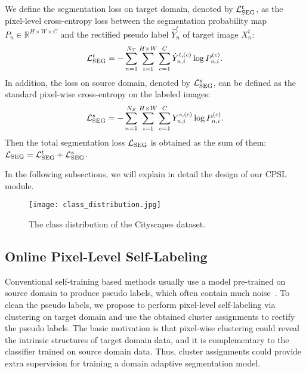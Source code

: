 \documentclass[10pt,twocolumn,letterpaper]{article}
\begin{document}
	We define the segmentation loss on target domain, denoted by $\mathcal{L}_{\rm SEG}^t$, as the pixel-level cross-entropy loss between the segmentation probability map $P_n\in \mathbb{R}^{H\times W\times C}$ and the rectified pseudo label $\hat{Y}_n^t$ of target image $X^t_{n}$:
\begin{align}
		\mathcal{L}_{\rm SEG}^t = -\sum_{n=1}^{N_T}\sum_{i=1}^{H\times W}\sum_{c=1}^{C}\hat{Y}^{t,(c)}_{n,i} \log{P}_{n,i}^{(c)}.
		\label{eq2}
	\end{align}   
In addition, the loss on source domain, denoted by $\mathcal{L}_{\rm SEG}^s$, can be defined as the standard pixel-wise cross-entropy on the labeled images:
	\begin{align}
		\mathcal{L}_{\rm SEG}^s = -\sum_{n=1}^{N_S}\sum_{i=1}^{H\times W}\sum_{c=1}^C Y_{n,i}^{s,(c)} \log P_{n,i}^{(c)}.
		\label{eq3}
	\end{align}
	Then the total segmentation loss $\mathcal{L}_{\rm SEG}$ is obtained as the sum of them: $\mathcal{L}_{\rm SEG} = \mathcal{L}^t_{\rm SEG}+\mathcal{L}^s_{\rm SEG}$.
	
	In the following subsections, we will explain in detail the design of our CPSL module.
	\begin{figure}
		\centering
		\texttt{[image: class\_distribution.jpg]}\\\vspace{-1.0em}
		\caption{The class distribution of the Cityscapes dataset. }
		\label{fig2}
		\vspace{-1.0em}
	\end{figure}
	\subsection{Online Pixel-Level Self-Labeling}
	\label{sec3.2}
	 Conventional self-training based methods usually use a model pre-trained on source domain to produce pseudo labels, which often contain much noise~\cite{zou2018domain,zou2019confidence,zhang2019category}. To clean the pseudo labels, we propose to perform pixel-level self-labeling via clustering on target domain and use the obtained cluster assignments to rectify the pseudo labels. The basic motivation is that pixel-wise clustering could reveal the intrinsic structures of target domain data, and it is complementary to the classifier trained on source domain data. Thus, cluster assignments could provide extra supervision for training a domain adaptive segmentation model. 
	
\end{document}
